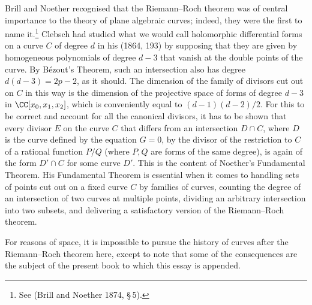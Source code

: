 Brill and Noether recognised that the Riemann--Roch theorem was of  central importance to the theory of plane algebraic curves; indeed, they were the first to name it.\footnote{See (Brill and Noether 1874, \S\,5).}  Clebsch had studied what we would call holomorphic diff\-erential forms on a curve $C$  of degree $d$ in his (1864, 193)  by supposing that they are given by homogeneous polynomials of degree $d-3$ that vanish at the double points of the curve. 
By B\'ezout's Theorem, such an intersection also has degree $d(d-3) = 2p-2$, as it should. The dimension of the family of divisors cut out on $C$ in this way is the dimension of the projective space of forms of degree $d-3$ in $\CC[x_0,x_1,x_2]$, which is conveniently equal to $(d-1)(d-2)/2$. For this to be correct and account for all the canonical divisors, it has to be shown that every divisor $E$ on the curve $C$ that differs from an intersection $D\cap C$, where $D$ is the curve defined by the equation $G = 0$,  by the divisor of the restriction to $C$ of a rational function $P/Q$ (where $P, Q$ are forms of the same degree), is again of the form $D'\cap C$ for some curve $D'$. This is the content of Noether's Fundamental Theorem. His Fundamental Theorem is essential when it comes  to handling  sets of points cut out on a fixed curve $C$ by families of curves, counting the degree of an intersection of two curves at multiple points,  dividing an arbitrary intersection into two subsets, and delivering a satisfactory version of the Riemann--Roch theorem. 

For reasons of space, it is impossible to pursue the history of curves after the Riemann--Roch theorem here, except to note that some of the consequences are the subject of the present book to which this essay is appended.


\begingroup

